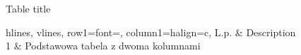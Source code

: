 \begin{table}[!ht]
    \centering
    \small
    \caption{Table title}\label{tbl:table-label}
    \begin{tblr}{%
        hlines,%
        vlines,%
        row{1}={font=\bfseries},%
        column{1}={halign=c},%
    }%
        L.p. & Description                         \\
        1    & Podstawowa tabela z dwoma kolumnami \\
    \end{tblr}
\end{table}

